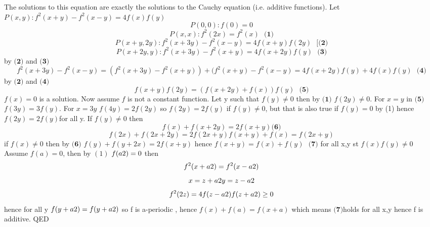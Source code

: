 \begin{solution}
	The solutions to this equation are exactly the solutions to the Cauchy equation (i.e. additive functions).
Let $P(x,y) :  f^2(x+y)-f^2(x-y)=4f(x)f(y)$
$$P(0,0): f(0)=0$$
$$P(x,x): f^2(2x)=f^2(x) \text{                  }  \textbf{(1)}$$
$$P(x+y,2y): f^2(x+3y)-f^2(x-y)=4f(x+y)f(2y) \text{                  } [\textbf{(2)}$$
$$P(x+2y,y): f^2(x+3y)-f^2(x+y)=4f(x+2y)f(y)  \text{                  }  \textbf{(3)}$$
by $\textbf{(2)}$ and $\textbf{(3)}$  $$ f^2(x+3y)-f^2(x-y)= (f^2(x+3y)-f^2(x+y)) + (f^2(x+y)-f^2(x-y)=4f(x+2y)f(y) + 4f(x)f(y) \text{      } 
 \textbf{(4)}$$
by $\textbf{(2)}$ and $\textbf{(4)}$  $$f(x+y)f(2y)=(f(x+2y)+f(x))f(y) \text{                  }  \textbf{(5)}$$
$f(x)=0$ is a solution. Now assume $f$ is not a constant function. 
Let y such that $f(y)\neq 0$ then by $\textbf{(1)}$ $f(2y)\neq0$. 
For $x=y$ in $\textbf{(5)}$ $f(3y)=3f(y)$. For $x=3y$  $f(4y)=2f(2y)$ so $f(2y)=2f(y)$ if $f(y)\neq0$, but that is also true if $f(y)=0$ by (1) hence $f(2y)=2f(y)$for all y.
If $f(y)\neq0$ then 
$$f(x)+f(x+2y)=2f(x+y)  \textbf{(6)}$$
$$f(2x)+f(2x+2y)=2f(2x+y) f(x+y)+f(x)=f(2x+y)$$
if $f(x)\neq0$ then by $ \textbf{(6)}$
$f(y)+f(y+2x)=2f(x+y)$ hence $f(x+y)=f(x)+f(y) \text{                  } \textbf{(7)}$ for all x,y st $f(x)f(y)\neq 0$
Assume $f(a)=0$, then by $(1)$    $f(a\/ 2)=0$
then $$f^2(x+a\/2)=f^2(x-a\/2)$$ 
$$x=z+a\/2 y=z-a\/2$$
$$f^2(2z)=4f(z-a\/2)f(z+a\/2) \geq 0$$ hence for all y $f(y+a\/2)=f(y+a\/2)$ so f is a-periodic , hence $f(x)+f(a)=f(x+a)$ which means $\textbf{(7)} $holds for all x,y hence f is additive.
QED
\end{solution}



